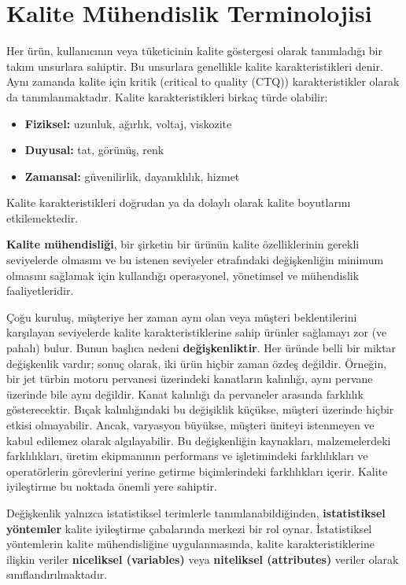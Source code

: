 \documentclass[
]{book}
\begin{document}
\hypertarget{kalite-muxfchendislik-terminolojisi}{%
\section{Kalite Mühendislik Terminolojisi}\label{kalite-muxfchendislik-terminolojisi}}

Her ürün, kullanıcının veya tüketicinin kalite göstergesi olarak tanımladığı bir takım unsurlara sahiptir. Bu unsurlara genellikle kalite karakteristikleri denir. Aynı zamanda kalite için kritik (critical to quality (CTQ)) karakteristikler olarak da tanımlanmaktadır. Kalite karakteristikleri birkaç türde olabilir:

\begin{itemize}
\item
  \textbf{Fiziksel:} uzunluk, ağırlık, voltaj, viskozite
\item
  \textbf{Duyusal:} tat, görünüş, renk
\item
  \textbf{Zamansal:} güvenilirlik, dayanıklılık, hizmet
\end{itemize}

Kalite karakteristikleri doğrudan ya da dolaylı olarak kalite boyutlarını etkilemektedir.

\textbf{Kalite mühendisliği}, bir şirketin bir ürünün kalite özelliklerinin gerekli seviyelerde olmasını ve bu istenen seviyeler etrafındaki değişkenliğin minimum olmasını sağlamak için kullandığı operasyonel, yönetimsel ve mühendislik faaliyetleridir.

Çoğu kuruluş, müşteriye her zaman aynı olan veya müşteri beklentilerini karşılayan seviyelerde kalite karakteristiklerine sahip ürünler sağlamayı zor (ve pahalı) bulur. Bunun başlıca nedeni \textbf{değişkenliktir}. Her üründe belli bir miktar değişkenlik vardır; sonuç olarak, iki ürün hiçbir zaman özdeş değildir. Örneğin, bir jet türbin motoru pervanesi üzerindeki kanatların kalınlığı, aynı pervane üzerinde bile aynı değildir. Kanat kalınlığı da pervaneler arasında farklılık gösterecektir. Bıçak kalınlığındaki bu değişiklik küçükse, müşteri üzerinde hiçbir etkisi olmayabilir. Ancak, varyasyon büyükse, müşteri üniteyi istenmeyen ve kabul edilemez olarak algılayabilir. Bu değişkenliğin kaynakları, malzemelerdeki farklılıkları, üretim ekipmanının performans ve işletimindeki farklılıkları ve operatörlerin görevlerini yerine getirme biçimlerindeki farklılıkları içerir. Kalite iyileştirme bu noktada önemli yere sahiptir.

Değişkenlik yalnızca istatistiksel terimlerle tanımlanabildiğinden, \textbf{istatistiksel yöntemler} kalite iyileştirme çabalarında merkezi bir rol oynar. İstatistiksel yöntemlerin kalite mühendisliğine uygulanmasında, kalite karakteristiklerine ilişkin veriler \textbf{niceliksel (variables)} veya \textbf{niteliksel (attributes)} veriler olarak sınıflandırılmaktadır.
\end{document}
